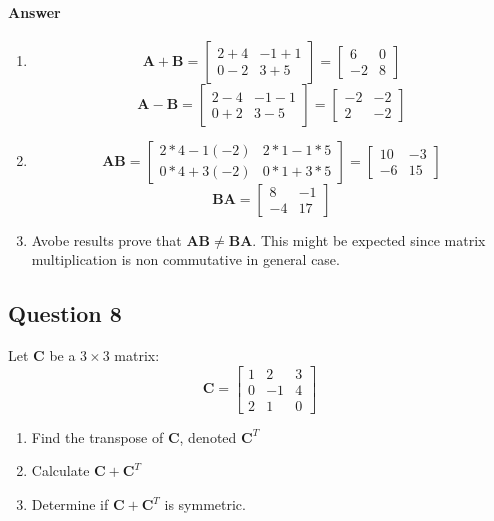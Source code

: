 \documentclass{article}
\begin{document}
\paragraph{Answer}
\begin{enumerate}
    \item $$\mathbf{A} + \mathbf{B} = \left[ \begin{array}{cc} 2+4 & -1+1 \\ 0-2 & 3+5 \end{array} \right] = \left[ \begin{array}{cc} 6 & 0 \\ -2 & 8 \end{array} \right]$$
    $$\mathbf{A} - \mathbf{B} = \left[ \begin{array}{cc} 2-4 & -1-1 \\ 0+2 & 3-5 \end{array} \right] = \left[ \begin{array}{cc} -2 & -2 \\ 2 & -2 \end{array} \right]$$
    \item $$\mathbf{A}\mathbf{B} = \left[ \begin{array}{cc} 2*4-1(-2) & 2*1-1*5 \\ 0*4+3(-2) & 0*1+3*5 \end{array} \right] = \left[ \begin{array}{cc} 10 & -3 \\ -6 & 15 \end{array} \right]
    $$
    $$\mathbf{B}\mathbf{A} = \left[ \begin{array}{cc} 8 & -1 \\ -4 & 17 \end{array} \right]
    $$
    \item Avobe results prove that $ \mathbf{A}\mathbf{B} \neq \mathbf{B}\mathbf{A} $. This might be expected since matrix multiplication is non commutative in general case.
\end{enumerate}

\subsection{Question 8}
Let $ \mathbf{C} $ be a $ 3 \times 3 $ matrix:
$$\mathbf{C} = \left[ \begin{array}{ccc} 1 & 2 & 3 \\ 0 & -1 & 4 \\ 2 & 1 & 0 \end{array} \right]$$
\begin{enumerate}
    \item Find the transpose of $ \mathbf{C} $, denoted $ \mathbf{C}^T $
    \item Calculate $ \mathbf{C} + \mathbf{C}^T $
    \item Determine if $ \mathbf{C} + \mathbf{C}^T $ is symmetric.
\end{enumerate}
\end{document}
